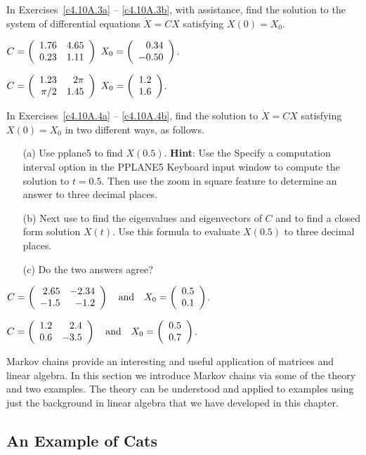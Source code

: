 \CEXER

\noindent In Exercises~\ref{c4.10A.3a} -- \ref{c4.10A.3b}, with \Matlab
assistance, find the solution to the system of differential equations
$\dot{X} = CX$ satisfying $X(0)=X_0$.
\begin{exercise}  \label{c4.10A.3a}
$C = \left(\begin{array}{rr} 1.76 & 4.65\\ 0.23 &1.11\end{array}\right)$ \AND $X_0 = \left(\begin{array}{r} 0.34 \\ -0.50\end{array}\right)$.
\end{exercise}
\begin{exercise}  \label{c4.10A.3b}
$C = \left(\begin{array}{rr} 1.23 & 2\pi\\ \pi/2 &1.45\end{array}\right)$ \AND $X_0 = \left(\begin{array}{r} 1.2 \\ 1.6\end{array}\right)$.
\end{exercise}

\noindent In Exercises~\ref{c4.10A.4a} -- \ref{c4.10A.4b}, find the solution 
to $\dot{X} = CX$ satisfying $X(0)=X_0$ in two different ways, as follows.  
\begin{itemize}
\item[(a)]  Use {\sf pplane5} to find $X(0.5)$.  {\bf Hint}: Use the 
{\sf Specify a computation interval} option in the {\sf PPLANE5 Keyboard input} 
window to compute the solution to $t=0.5$. Then use the {\sf zoom in square} 
feature to determine an answer to three decimal places.  
\item[(b)]  Next use \Matlab to find the eigenvalues and eigenvectors of $C$ 
and to find a closed form solution $X(t)$.  Use this formula to evaluate 
$X(0.5)$ to three decimal places.    
\item[(c)]  Do the two answers agree?
\end{itemize}
\begin{exercise}  \label{c4.10A.4a}  
$C = \left(\begin{array}{rr} 2.65 & -2.34\\ -1.5 &-1.2\end{array}\right) \quad\mbox{and}\quad X_0=\left(\begin{array}{r} 0.5 \\ 0.1\end{array}\right)$.
\end{exercise}
\begin{exercise}  \label{c4.10A.4b}  
$C = \left(\begin{array}{rr} 1.2 & 2.4\\ 0.6 &-3.5\end{array}\right) \quad\mbox{and}\quad X_0=\left(\begin{array}{r} 0.5 \\ 0.7\end{array}\right)$.
\end{exercise}

\label{S:TransitionApplied}

Markov chains provide an interesting and useful application of matrices and
linear algebra.  In this section we introduce Markov chains via some of the
theory and two examples.  The theory can be understood and applied to examples
using just the background in linear algebra that we have developed in this
chapter.


\subsection*{An Example of Cats}

